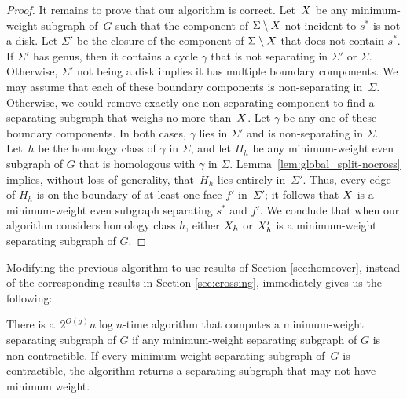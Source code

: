 \documentclass[letterpaper,review]{siamart190516}
\def\rnote#1{\color{red}Review: #1 \color{black}}
\def\knote#1{\textcolor{olive}{Kyle: #1}}
\begin{document}
{\begin{proof}
It remains to prove that our algorithm is correct.  Let~$X$ be any minimum-weight subgraph
of~$G$ such that the component of $\Sigma \setminus X$ not incident to $s^*$ is not a disk.
Let $\Sigma'$ be the closure of the component of $\Sigma \setminus X$ that does not contain
$s^*$.  
If \(\Sigma'\) has genus, then it contains a cycle $\gamma$ that is not separating in $\Sigma'$ or
\(\Sigma\).
Otherwise, \(\Sigma'\) not being a disk implies it has multiple boundary components.
We may assume that each of these boundary components is non-separating in~\(\Sigma\).
Otherwise, we could remove exactly one non-separating component to find a separating subgraph that
weighs no more than~\(X\).
Let \(\gamma\) be any one of these boundary components.
In both cases, \(\gamma\) lies in \(\Sigma'\) and is non-separating in \(\Sigma\).
Let~$h$ be the homology class of $\gamma$ in
$\Sigma$, and let $H_h$ be any minimum-weight even subgraph of $G$ that is homologous with $\gamma$
in $\Sigma$.  Lemma~\ref{lem:global_split-nocross} implies, without loss of generality, that~$H_h$
lies entirely in~$\Sigma'$.  Thus, every edge of $H_h$ is on the boundary of at least one face $f'$
in~$\Sigma'$; it follows that $X$ is a minimum-weight even subgraph separating $s^*$ and $f'$.  We conclude that when our algorithm considers homology class $h$, either $X_h$ or $X'_h$ is a minimum-weight separating subgraph of $G$.
\end{proof}

Modifying the previous algorithm to use results of Section \ref{sec:homcover}, instead of the corresponding results in Section \ref{sec:crossing}, immediately gives us the following:

\begin{lemma}
\label{lem:global_split-alg2}
There is a~$2^{O(g)} n \log n$-time algorithm that computes a minimum-weight separating subgraph of $G$ if any minimum-weight separating subgraph of $G$ is non-contractible.  If every minimum-weight separating subgraph of~$G$ is contractible, the algorithm returns a separating subgraph that may not have minimum weight.
\end{lemma}

}
\end{document}
